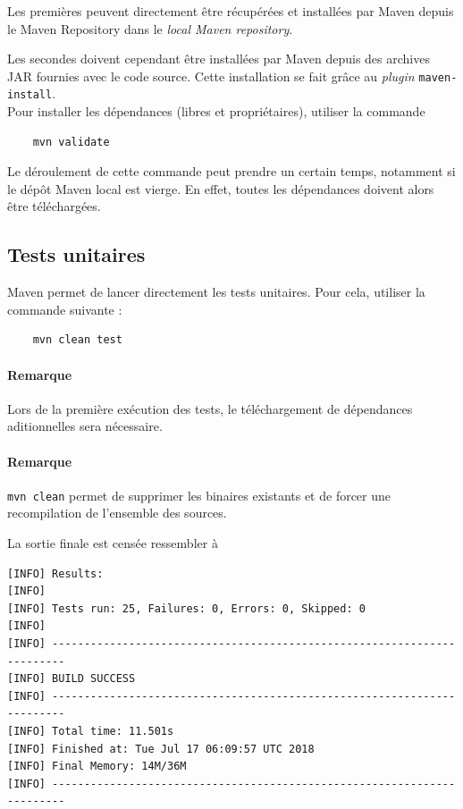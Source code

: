 \documentclass{article}
\begin{document}
Les premières peuvent directement être récupérées et installées par Maven depuis le Maven Repository dans le \emph{local Maven repository}.

Les secondes doivent cependant être installées par Maven depuis des archives JAR fournies avec le code source. Cette installation se fait grâce au \emph{plugin} \texttt{maven-install}. \\

Pour installer les dépendances (libres et propriétaires), utiliser la commande 

\begin{verbatim}
    mvn validate
\end{verbatim}

Le déroulement de cette commande peut prendre un certain temps, notamment si le dépôt Maven local est vierge. En effet, toutes les dépendances doivent alors être téléchargées.

\subsection{Tests unitaires}

Maven permet de lancer directement les tests unitaires. Pour cela, utiliser la commande suivante :

\begin{verbatim}
    mvn clean test
\end{verbatim}

\paragraph{Remarque} Lors de la première exécution des tests, le téléchargement de dépendances aditionnelles sera nécessaire.

\paragraph{Remarque} \texttt{mvn clean} permet de supprimer les binaires existants et de forcer une recompilation de l'ensemble des sources.

La sortie finale est censée ressembler à 

\begin{verbatim}
[INFO] Results:
[INFO] 
[INFO] Tests run: 25, Failures: 0, Errors: 0, Skipped: 0
[INFO] 
[INFO] ------------------------------------------------------------------------
[INFO] BUILD SUCCESS
[INFO] ------------------------------------------------------------------------
[INFO] Total time: 11.501s
[INFO] Finished at: Tue Jul 17 06:09:57 UTC 2018
[INFO] Final Memory: 14M/36M
[INFO] ------------------------------------------------------------------------
\end{verbatim}
\end{document}

